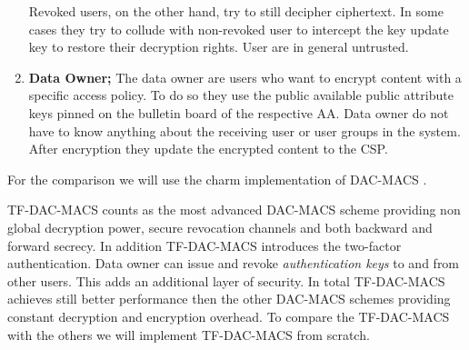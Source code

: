 \begin{enumerate}
	Revoked users, on the other hand, try to still decipher ciphertext. In some cases they try to collude with non-revoked user to intercept the key update key to restore their decryption rights. 
	User are in general untrusted.
	\item \textbf{Data Owner;} The data owner are users who want to encrypt content with a specific access policy. To do so they use the public available public attribute keys pinned on the bulletin board of the respective \ac{AA}. Data owner do not have to know anything about the receiving user or user groups in the system. After encryption they update the encrypted content to the \ac{CSP}.
\end{enumerate} 

For the comparison we will use the charm implementation of DAC-MACS \cite{yang2013dac}.

\ac{TF-DAC-MACS} counts as the most advanced \ac{DAC-MACS} scheme providing non global decryption power, secure revocation channels and both backward and forward secrecy. In addition \ac{TF-DAC-MACS} introduces the two-factor authentication. Data owner can issue and revoke \textit{authentication keys} to and from other users. This adds an additional layer of security. In total \ac{TF-DAC-MACS} achieves still better performance then the other \ac{DAC-MACS} schemes providing constant decryption and encryption overhead. 
To compare the TF-DAC-MACS with the others we will implement TF-DAC-MACS from scratch. 

